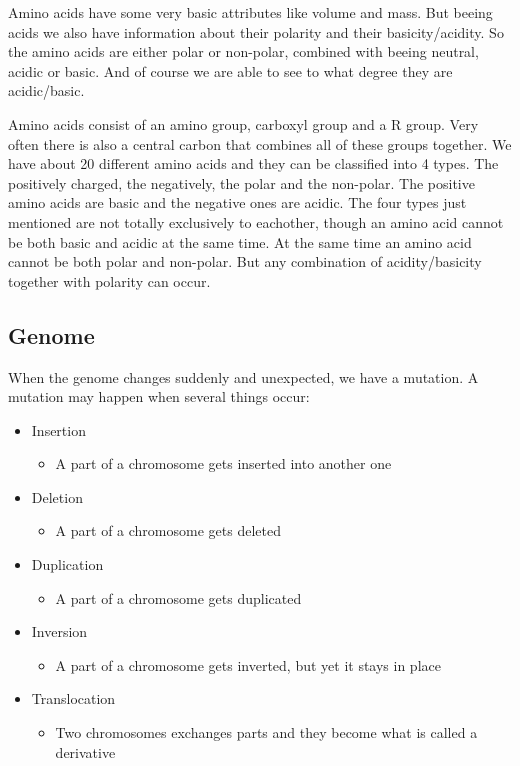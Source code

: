 \documentclass[UKenglish,11pt,a4paper]{article}
\begin{document}
Amino acids have some very basic attributes like volume and mass. But beeing acids we also have information about their
polarity and their basicity/acidity. So the amino acids are either polar or non-polar, combined with beeing neutral,
acidic or basic. And of course we are able to see to what degree they are acidic/basic.

Amino acids consist of an amino group, carboxyl group and a R group. Very often there is also a central carbon that
combines all of these groups together. We have about 20 different amino acids and they can be classified into 4 types.
The positively charged, the negatively, the polar and the non-polar. The positive amino acids are basic and the negative
ones are acidic. The four types just mentioned are not totally exclusively to eachother, though an amino acid cannot be
both basic and acidic at the same time. At the same time an amino acid cannot be both polar and non-polar. But any
combination of acidity/basicity together with polarity can occur.
\subsection*{Genome}
When the genome changes suddenly and unexpected, we have a mutation. A mutation may happen when several things occur:
\begin{itemize}
    \item Insertion
        \begin{itemize}
            \item A part of a chromosome gets inserted into another one
        \end{itemize}
    \item Deletion
        \begin{itemize}
            \item A part of a chromosome gets deleted
        \end{itemize}
    \item Duplication
        \begin{itemize}
            \item A part of a chromosome gets duplicated
        \end{itemize}
    \item Inversion
        \begin{itemize}
            \item A part of a chromosome gets inverted, but yet it stays in place
        \end{itemize}
    \item Translocation
        \begin{itemize}
            \item Two chromosomes exchanges parts and they become what is called a derivative
        \end{itemize}
\end{itemize}
\printbibliography
\end{document}
